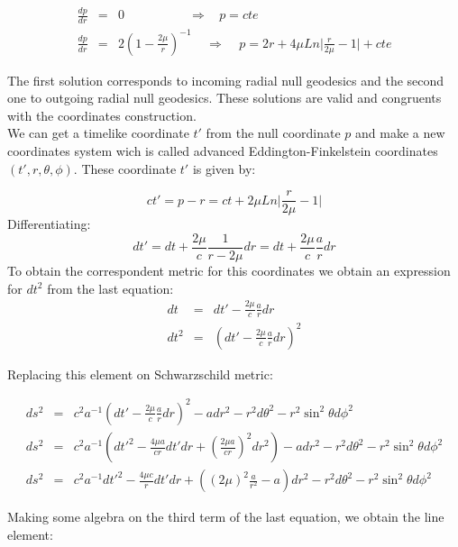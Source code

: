 \documentclass[letterpaper,11pt,onecolumn]{article}
\begin{document}
\begin{eqnarray*}
\frac{dp}{dr}&=&0  \ \ \ \ \ \ \ \  \ \ \ \ \ \ \ \ \ \ \ \ \ \ \ \Rightarrow \ \ \ \  p=cte \\
\frac{dp}{dr}&=&2\left( 1 - \frac{2\mu}{r}\right)^{-1}
 \ \ \ \ \ \Rightarrow \ \ \ \ \ p=2r+4\mu Ln\Big| \frac{r}{2\mu}-1 \Big|+cte 
\end{eqnarray*} 

The first solution corresponds to incoming radial null geodesics and the second one to outgoing radial null geodesics. These solutions are valid and congruents with the coordinates construction.\\

We can get a timelike coordinate $t'$ from the null coordinate $p$ and make a new coordinates system wich is called advanced Eddington-Finkelstein coordinates $(t',r,\theta,\phi)$. These coordinate $t'$ is given by:

\begin{equation}
    ct'= p-r=ct+2\mu Ln\Big| \frac{r}{2\mu}-1 \Big|
\end{equation}
Differentiating: 
\begin{equation*}
    dt'= dt +\frac{2\mu}{c}\frac{1}{r-2\mu}dr=dt+\frac{2\mu}{c}\frac{a}{r}dr 
\end{equation*}
To obtain the correspondent metric for this coordinates we obtain an expression for $dt^2$ from the last equation:
\begin{eqnarray*}
    dt&=& dt' -\frac{2\mu}{c}\frac{a}{r}dr \\
    dt^{2}&=& \left(dt' -\frac{2\mu}{c}\frac{a}{r}dr\right)^2
\end{eqnarray*}

Replacing this element on Schwarzschild metric:

\begin{eqnarray*}
    	ds^2 &=&c^2a^{-1}\left(dt' -\frac{2\mu}{c}\frac{a}{r}dr\right)^2 - a dr^2 - r^2 d\theta^2 - r^2 \sin^2 \theta d\phi^2\\
    	ds^2 &=& c^2a^{-1}\left(dt'^2 -\frac{4\mu a}{cr}dt'dr+\left(\frac{2\mu a}{cr}\right)^2dr^2\right) - a dr^2 - r^2 d\theta^2 - r^2 \sin^2 \theta d\phi^2\\
    	ds^2 &=& c^2a^{-1}dt'^2- \frac{4\mu c}{r}dt'dr+\left((2\mu)^2\frac{a}{r^2}-a \right)dr^2- r^2 d\theta^2 - r^2 \sin^2 \theta d\phi^2
\end{eqnarray*}

Making some algebra on the third term of the last equation, we obtain the line element:
\end{document}

